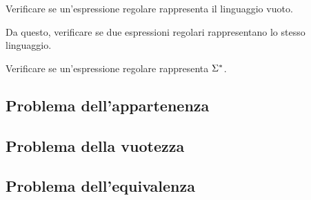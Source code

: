 Verificare se un'espressione regolare rappresenta il linguaggio vuoto.

Da questo, verificare se due espressioni regolari rappresentano lo stesso linguaggio.

Verificare se un'espressione regolare rappresenta $\Sigma{}^{\ast}$.


\subsection{Problema dell'appartenenza}\label{sec:appartenenza-ER}

\subsection{Problema della vuotezza}\label{sec:vuotezza-ER}

\subsection{Problema dell'equivalenza}\label{sec:equivalenza-ER}


